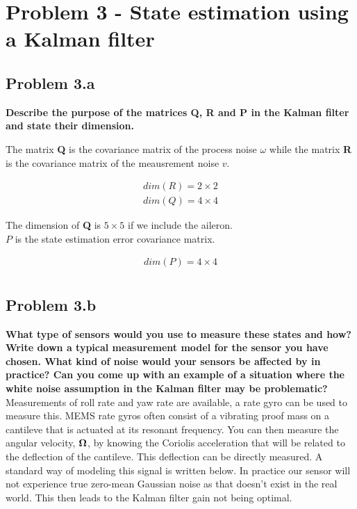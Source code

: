\section*{Problem 3 - State estimation using a Kalman filter}


\subsection*{Problem 3.a} 
\textbf{Describe the purpose of the matrices \textbf{Q}, \textbf{R} and \textbf{P}  in the Kalman filter and state their dimension. }

The matrix  \textbf{Q} is the covariance matrix of the process noise $\omega$ while the matrix \textbf{R} is the covariance matrix of the meausrement noise $v$. 

\begin{align}
    dim(R) = 2\times2 \\
    dim(Q) = 4\times4 
\end{align}

The dimension of \textbf{Q} is $5\times5$ if we include the aileron. \\ 
$P$ is the state estimation error covariance matrix. 

\begin{align}
    dim(P) = 4\times4 \\
\end{align}

\subsection*{Problem 3.b}
\textbf{What type of sensors would you use to
measure these states and how? Write down a typical measurement model for the sensor you
have chosen. What kind of noise would your sensors be affected by in practice? Can you come
up with an example of a situation where the white noise assumption in the Kalman filter may
be problematic?} \\


Measurements of roll rate and yaw rate are available, a rate gyro can be used to measure this. MEMS rate gyros often consist of a vibrating proof mass on a cantileve that is actuated at its resonant frequency. You can then measure the angular velocity, $\bf{\Omega}$, by knowing the Coriolis acceleration that will be related to the deflection of the cantileve. This deflection can be directly measured. A standard way of modeling this signal is written below. In practice our sensor will not experience true zero-mean Gaussian noise as that doesn't exist in the real world. This then leads to the Kalman filter gain not being optimal.


